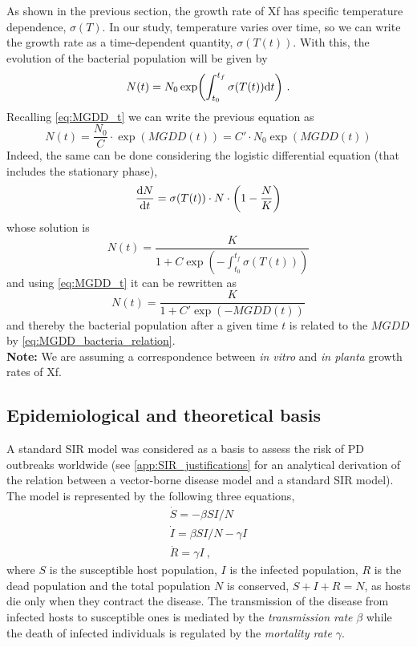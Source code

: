As shown in the previous section, the growth rate of Xf has specific
temperature dependence, $\sigma(T)$. In our study, temperature varies over
time, so we can write the growth rate as a time-dependent quantity,
$\sigma(T(t))$. With this, the evolution of the bacterial population will be
given by
\begin{equation}
    N(t)=N_0\exp(\int_{t_0}^{t_f}\sigma(T(t)) \mathrm{d} t) \ .
\end{equation}
Recalling \cref{eq:MGDD_t} we can write the previous equation as
\begin{equation}
    N(t)=\frac{N_0}{C}\cdot\exp(MGDD(t))=C'\cdot N_0\exp(MGDD(t))
\end{equation}
Indeed, the same can be done considering the logistic differential equation
(that includes the stationary phase),
\begin{equation}
    \frac{\mathrm{d} N}{\mathrm{d} t}=\sigma(T(t))\cdot N\cdot\left(1-\frac{N}{K}\right)
\end{equation}
whose solution is
\begin{equation}
    N(t)=\frac{K}{1+C\exp(-\int_{t_0}^{t_f}\sigma(T(t)))}
\end{equation}
and using \cref{eq:MGDD_t} it can be rewritten as
\begin{equation}\label{eq:MGDD_bacteria_relation}
    N(t)=\frac{K}{1+C'\exp(-MGDD(t))}
\end{equation}
and thereby the bacterial population after a given time $t$ is related to
the $MGDD$ by \cref{eq:MGDD_bacteria_relation}.\\

\textbf{Note:} We are assuming a correspondence between \textit{in vitro}
and \textit{in planta} growth rates of Xf.

\subsection{Epidemiological and theoretical basis}\label{app:SIR}

A standard SIR model was considered as a basis to assess the risk of PD
outbreaks worldwide (see \cref{app:SIR_justifications} for an analytical
derivation of the relation between a vector-borne disease model and a standard
SIR model). The model is represented by the following three equations,
\begin{equation}
    \begin{array}{l}
        \dot{S}=-\beta SI/N           \\
        \dot{I}=\beta SI/N - \gamma I \\
        \dot{R}=\gamma I \ ,
    \end{array}
    \label{eq:SIRmodel}
\end{equation}
where $S$ is the susceptible host population, $I$ is the infected
population, $R$ is the dead population and the total population $N$ is
conserved, $S+I+R=N$, as hosts die only when they contract the disease.
The transmission of the disease from infected hosts to susceptible ones is
mediated by the \textit{transmission rate} $\beta$ while the death of infected
individuals is regulated by the \textit{mortality rate} $\gamma$.

